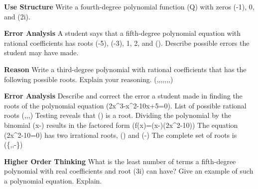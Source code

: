\documentclass{article}
\newenvironment{practice}[2]{}{}        %
\newcommand{\answer}[1]{}               %
\newcommand{\te}[1]{}                   %
\begin{document}
\begin{practice}{14}{2}
\textbf{Use Structure} Write a fourth-degree polynomial function (Q) with zeros (-1), 0, and (2i).
\answer{(Q(x)=x^4+x^3+4x^2+4x)}
\end{practice}
\begin{practice}{15}{2}
\textbf{Error Analysis} A student says that a fifth-degree polynomial equation with rational coefficients has roots (-5), (-3), 1, 2, and (). Describe possible errors the student may have made.
\answer{Irrational roots come in pairs. Either the student incorrectly calculated (\sqrt{3}) to be a root, or one of the real roots should be (-\sqrt{3}).}
\end{practice}
\begin{practice}{16}{2}
\textbf{Reason} Write a third-degree polynomial with rational coefficients that has the following possible roots. Explain your reasoning.
(\pm{},\pm{},\pm{},\pm{},\pm{},\pm{},\pm{},\pm{})
\answer{Answers may vary. Sample: (2x^3+7x^2+x-10); Assume that the coefficients of the polynomial have no common integer factors other than 1 and (-1). The denominators of the possible roots are 1 and 2. A number that has factors of 1 and 2 is 2. So, the leading coefficient must be 2 or (-2). The numerators of the possible roots are 1, 2, 5, and 10. A number that has factors of 1, 2, 5, and 10 is 10. So the constant term must be 10 or (-10). The leading term must have degree 3 since the equation is a third-degree polynomial.}
\end{practice}
\begin{practice}{17}{2}
\textbf{Error Analysis} Describe and correct the error a student made in finding the roots of the polynomial equation (2x^3-x^2-10x+5=0).
List of possible rational roots
(,\pm{},,\pm{})
Testing reveals that () is a root.
Dividing the polynomial by the binomial (x-) results in the factored form
(f(x)=(x-)(2x^2-10))
The equation (2x^2-10=0) has two irrational roots, () and (-)
The complete set of roots is (\{,,-\})
\te{The printed student work is marked incorrect.}
\answer{The equation (2x^2-10=0) can be written as (2(x^2-5)=0), which has two irrational roots, (\sqrt{5}) and (-\sqrt{5}), not (\sqrt{10}) and (-\sqrt{10}).}
\end{practice}
\begin{practice}{18}{3}
\textbf{Higher Order Thinking} What is the least number of terms a fifth-degree polynomial with real coefficients and root (3i) can have? Give an example of such a polynomial equation. Explain.
\answer{2; Answers may vary. Sample: (P(x)=x^5+9x^3); Because (3i) is a root, (-3i) is also a root. The factors are ((x+3i)) and ((x-3i)). Use the FOIL method to get (x^2+9). In order for the equation to be a fifth-degree polynomial, multiply each term by (x^3) to get (x^5+9x^3).}
\end{practice}
\end{document}
